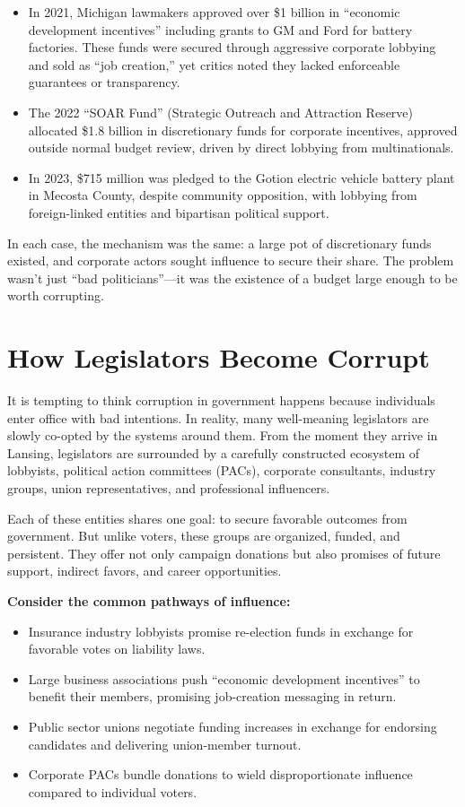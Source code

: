 \begin{itemize}
    \item In 2021, Michigan lawmakers approved over \$1 billion in ``economic development incentives'' including grants to GM and Ford for battery factories. These funds were secured through aggressive corporate lobbying and sold as ``job creation,'' yet critics noted they lacked enforceable guarantees or transparency.
    \item The 2022 ``SOAR Fund'' (Strategic Outreach and Attraction Reserve) allocated \$1.8 billion in discretionary funds for corporate incentives, approved outside normal budget review, driven by direct lobbying from multinationals.
    \item In 2023, \$715 million was pledged to the Gotion electric vehicle battery plant in Mecosta County, despite community opposition, with lobbying from foreign-linked entities and bipartisan political support.
\end{itemize}

In each case, the mechanism was the same: a large pot of discretionary funds existed, and corporate actors sought influence to secure their share. The problem wasn’t just ``bad politicians''—it was the existence of a budget large enough to be worth corrupting.

\section{How Legislators Become Corrupt}

It is tempting to think corruption in government happens because individuals enter office with bad intentions. In reality, many well-meaning legislators are slowly co-opted by the systems around them. From the moment they arrive in Lansing, legislators are surrounded by a carefully constructed ecosystem of lobbyists, political action committees (PACs), corporate consultants, industry groups, union representatives, and professional influencers.

Each of these entities shares one goal: to secure favorable outcomes from government. But unlike voters, these groups are organized, funded, and persistent. They offer not only campaign donations but also promises of future support, indirect favors, and career opportunities.

\textbf{Consider the common pathways of influence:}
\begin{itemize}
    \item Insurance industry lobbyists promise re-election funds in exchange for favorable votes on liability laws.
    \item Large business associations push ``economic development incentives'' to benefit their members, promising job-creation messaging in return.
    \item Public sector unions negotiate funding increases in exchange for endorsing candidates and delivering union-member turnout.
    \item Corporate PACs bundle donations to wield disproportionate influence compared to individual voters.
\end{itemize}

